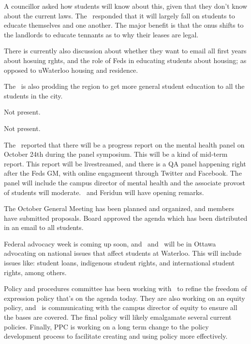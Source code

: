 \begin{information}
    A councillor asked how students will know about this, given that they don't
    know about the current laws. The \vpe\ responded that it will largely fall
    on students to educate themselves and one another. The major benefit is
    that the onus shifts to the landlords to educate tennants as to why their
    leases are legal. 

    There is currently also discussion about whether they want to email all
    first years about hosuing rghts, and the role of Feds in educating students
    about housing; as opposed to uWaterloo housing and residence. 

    The \vped\ is also prodding the region to get more general student 
    education to all the students in the city. 
\end{information}

\begin{information}
    Not present.
\end{information}

\begin{information}
    Not present.
\end{information}

\begin{information}

    The \pres\ reported that there will be a progress report on the mental
    health panel on October 24th during the panel symposium. This will be a
    kind of mid-term report. This report will be livestreamed, and there is
    a QA panel happening right after the Feds GM, with online engagmeent through
    Twitter and Facebook. The panel will include the campus director of mental 
    health and the associate provost of students will moderate. \antonio\ and 
    Feridun will have opening remarks.

    The October General Meeting has been planned and organized, and members 
    have submitted proposals. Board approved the agenda which has been
    distributed in an email to all students.

    Federal advocacy week is coming up soon, and \antonio\ and \andrewc\ will 
    be in Ottawa advocating on national issues that affect students at 
    Waterloo. This will include issues like: student loans, indigenous student
    rights, and international student rights, among others.  

    Policy and procedures committee has been working with \alex\ to refine the
    freedom of expression policy that's on the agenda today. They are also
    working on an equity policy, and \antonio\ is communicating with the campus 
    director of equity to ensure all the bases are covered. The final policy
    will likely emalgamate several current policies.  Finally, PPC is working 
    on a long term change to the policy development process to facilitate
    creating and using policy more effectively.

\end{information}

